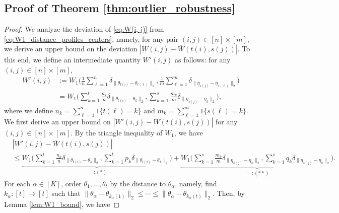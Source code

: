 \documentclass[11pt,letterpaper]{article}
\theoremstyle{definition}
\numberwithin{equation}{section}
\begin{document}
\subsection{Proof of Theorem \ref{thm:outlier_robustness}}
\label{sec:proof_outlier_robustness}
\begin{proof}
    We analyze the deviation of \eqref{eq:W(i, j)} from \eqref{eq:W1_distance_profiles_centers}, namely, for any pair $(i, j) \in [n] \times [m]$, we derive an upper bound on the deviation $|W(i, j) - \overline{W}(t(i), s(j))|$. To this end, we define an intermediate quantity $W'(i, j)$ as follows: for any $(i, j) \in [n] \times [m]$,
    \begin{equation*}
        \begin{split}
            W'(i, j) 
            & := W_1\bigg(\frac{1}{n} \sum_{\ell = 1}^{n} \delta_{\|\theta_{t(i)} - \theta_{t(\ell)}\|_2}, \frac{1}{m} \sum_{\ell = 1}^{m} \delta_{\|\eta_{s(j)} - \eta_{s(\ell)}\|_2}\bigg) \\
            & = W_1\bigg(\sum_{k = 1}^{t} \frac{n_k}{n} \delta_{\|\theta_{t(i)} - \theta_k\|_2}, \sum_{k = 1}^{s} \frac{m_k}{m} \delta_{\|\eta_{s(j)} - \eta_k\|_2}\bigg),
        \end{split}
    \end{equation*}
    where we define $n_k = \sum_{\ell = 1}^{n} 1\{t(\ell) = k\}$ and $m_k = \sum_{\ell = 1}^{m} 1\{s(\ell) = k\}$. We first derive an upper bound on $|W'(i, j) - \overline{W}(t(i), s(j))|$ for any $(i, j) \in [n] \times [m]$. By the triangle inequality of $W_1$, we have
    \begin{equation*}
        \begin{split}
            & |W'(i, j) - \overline{W}(t(i), s(j))| \\
            & \le \underbrace{W_1\bigg(\sum_{k = 1}^{t} \frac{n_k}{n} \delta_{\|\theta_{t(i)} - \theta_k\|_2}, \sum_{k = 1}^{t} p_k \delta_{\|\theta_{t(i)} - \theta_k\|_2}\bigg)}_{=: (*)} + \underbrace{W_1\bigg(\sum_{k = 1}^{s} \frac{m_k}{m} \delta_{\|\eta_{s(j)} - \eta_k\|_2}, \sum_{k = 1}^{s} q_k \delta_{\|\eta_{s(j)} - \eta_k\|_2}\bigg)}_{=: (**)}.
        \end{split}
    \end{equation*}    
    For each $\alpha \in [K]$, order $\theta_1, \ldots, \theta_t$ by the distance to $\theta_\alpha$, namely, find $k_\alpha \colon [t] \to [t]$ such that $\|\theta_\alpha - \theta_{k_\alpha(1)}\|_2 \le \cdots \le \|\theta_\alpha - \theta_{k_\alpha(t)}\|_2$. Then, by Lemma \ref{lem:W1_bound}, we have

\end{proof}
\end{document}
